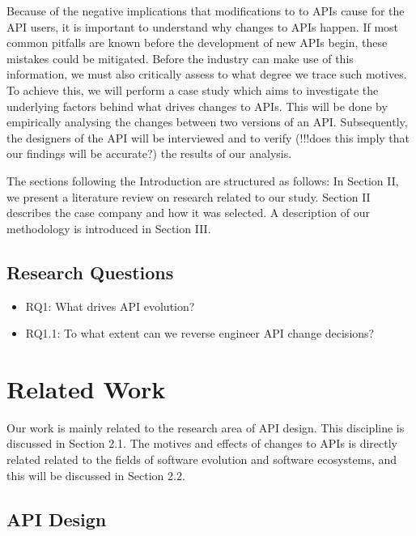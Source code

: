\documentclass[10pt,twocolumn]{article}
\begin{document}
Because of the negative implications that modifications to to APIs cause for the API users, it is important to understand why changes to APIs happen. If most common pitfalls are known before the development of new APIs begin, these mistakes could be mitigated. Before the industry can make use of this information, we must also critically assess to what degree we trace such motives. To achieve this, we will perform a case study which aims to investigate the underlying factors behind what drives changes to APIs. This will be done by empirically analysing the changes between two versions of an API. Subsequently, the designers of the API will be interviewed and to verify (!!!does this imply that our findings will be accurate?) the results of our analysis. 

The sections following the Introduction are structured as follows: In Section II, we present a literature review on research related to our study. Section II describes the case company and how it was selected. A description of our methodology is introduced in Section III. 

\subsection{Research Questions}
\begin{itemize}
\item RQ1: What drives API evolution? 
\item RQ1.1: To what extent can we reverse engineer API change decisions?
\end{itemize}


\section{Related Work}
Our work is mainly related to the research area of API design. This discipline is discussed in Section 2.1. The motives and effects of changes to APIs is directly related related to the fields of software evolution and software ecosystems, and this will be discussed in Section 2.2. 

\subsection{API Design}
\end{document}
